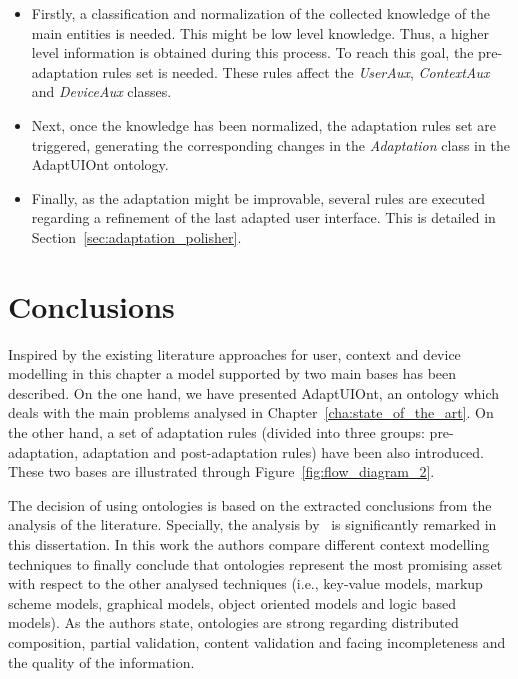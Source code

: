 \begin{itemize}
  \item Firstly, a classification and normalization of the collected knowledge of
  the main entities is needed. This might be low level knowledge. Thus, a higher
  level information is obtained during this process. To reach this goal, the
  pre-adaptation rules set is needed. These rules affect the \textit{UserAux},
  \textit{ContextAux} and \textit{DeviceAux} classes.
  
  \item Next, once the knowledge has been normalized, the adaptation rules set
  are triggered, generating the corresponding changes in the \textit{Adaptation}
  class in the AdaptUIOnt ontology.
  
  \item Finally, as the adaptation might be improvable, several rules are executed
  regarding a refinement of the last adapted user interface. This is detailed
  in Section~\ref{sec:adaptation_polisher}.
\end{itemize}



\section{Conclusions}
\label{sec:adaptui_conclusions}

Inspired by the existing literature approaches for user, context and device
modelling in this chapter a model supported by two main bases has been described.
On the one hand, we have presented AdaptUIOnt, an ontology which deals with the
main problems analysed in Chapter~\ref{cha:state_of_the_art}. On the other hand,
a set of adaptation rules (divided into three groups: pre-adaptation, adaptation
and post-adaptation rules) have been also introduced. These two bases are
illustrated through Figure~\ref{fig:flow_diagram_2}.

The decision of using ontologies is based on the extracted conclusions from the
analysis of the literature. Specially, the analysis by~\citet{strang_context_2004}
is significantly remarked in this dissertation. In this work the authors compare
different context modelling techniques to finally conclude that ontologies
represent the most promising asset with respect to the other analysed techniques
(i.e., key-value models, markup scheme models, graphical models, object oriented
models and logic based models). As the authors state, ontologies are strong
regarding distributed composition, partial validation, content validation
and facing incompleteness and the quality of the information.

